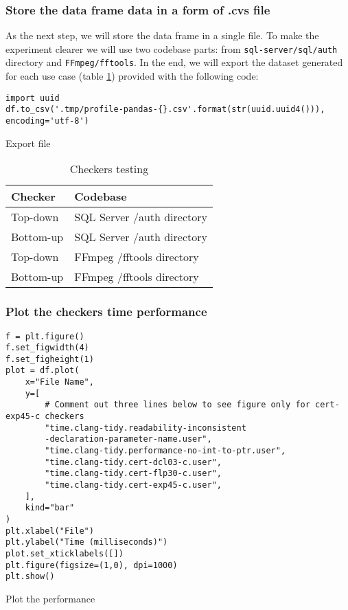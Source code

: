 \subsubsection{Store the data frame data in a form of .cvs file}
As the next step, we will store the data frame in a single file. To make the experiment clearer we will use two codebase parts: from \lstinline{sql-server/sql/auth} directory and \lstinline{FFmpeg/fftools}. In the end, we will export the dataset generated for each use case (table \ref{tab:ch-test-cats}) provided with the following code:  

\begin{listing}[h]
\begin{verbatim}
import uuid
df.to_csv('.tmp/profile-pandas-{}.csv'.format(str(uuid.uuid4())), encoding='utf-8')
\end{verbatim}
\caption{Export file}
\end{listing}


\begin{table}[H]
    \centering
    \begin{tabular}{|m{}|m{}|}
        \hline
        \textbf{Checker} & \textbf{Codebase}  \\
        \hline
        Top-down & SQL Server /auth directory  \\
        \hline
        Bottom-up & SQL Server /auth directory  \\
        \hline
        Top-down & FFmpeg /fftools directory  \\
        \hline
        Bottom-up & FFmpeg /fftools directory  \\
        \hline 
    \end{tabular}
    \caption{Checkers testing}
    \label{tab:ch-test-cats}
\end{table}


\subsubsection{Plot the checkers time performance}

\begin{code}
\begin{verbatim}
f = plt.figure()
f.set_figwidth(4)
f.set_figheight(1)
plot = df.plot(
    x="File Name",
    y=[
        # Comment out three lines below to see figure only for cert-exp45-c checkers
        "time.clang-tidy.readability-inconsistent
        -declaration-parameter-name.user",
        "time.clang-tidy.performance-no-int-to-ptr.user",
        "time.clang-tidy.cert-dcl03-c.user",
        "time.clang-tidy.cert-flp30-c.user",
        "time.clang-tidy.cert-exp45-c.user", 
    ], 
    kind="bar"
)
plt.xlabel("File")
plt.ylabel("Time (milliseconds)")
plot.set_xticklabels([])
plt.figure(figsize=(1,0), dpi=1000)
plt.show()
\end{verbatim}
\caption{Plot the performance}
\end{code}


